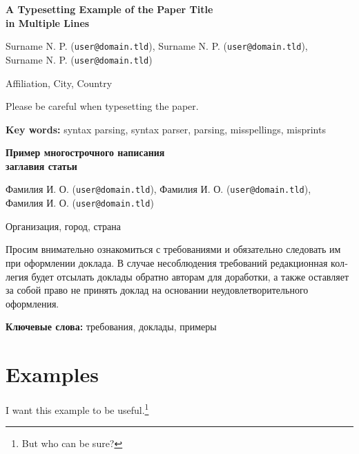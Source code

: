 \documentclass{dialogue}
\begin{document}
\begin{otherlanguage}{english}
\begin{center}
{\Large\bfseries{A Typesetting Example of the Paper Title\\in Multiple Lines}}

\medskip

Surname N. P. (\texttt{user@domain.tld}), Surname N. P. (\texttt{user@domain.tld}),\\Surname N. P. (\texttt{user@domain.tld})

\medskip

Affiliation, City, Country
\end{center}

Please be careful when typesetting the paper.\medskip

\textbf{Key words:} syntax parsing, syntax parser, parsing, misspellings, misprints
\end{otherlanguage}

\bigskip

\begin{otherlanguage}{russian}
\begin{center}
{\Large\bfseries{Пример многострочного написания\\заглавия статьи}}

\medskip

Фамилия И. О. (\texttt{user@domain.tld}), Фамилия И. О. (\texttt{user@domain.tld}),\\Фамилия И. О. (\texttt{user@domain.tld})

\medskip

Организация, город, страна
\end{center}

Просим внимательно ознакомиться с требованиями и обязательно следовать им при оформлении доклада. В случае несоблюдения требований редакционная коллегия будет отсылать доклады обратно авторам для доработки, а также оставляет за собой право не принять доклад на основании неудовлетворительного оформления.\medskip

\textbf{Ключевые слова:} требования, доклады, примеры
\end{otherlanguage}


\section{Examples}

I want this example to be useful.\footnote{But who can be sure?}
\end{document}

